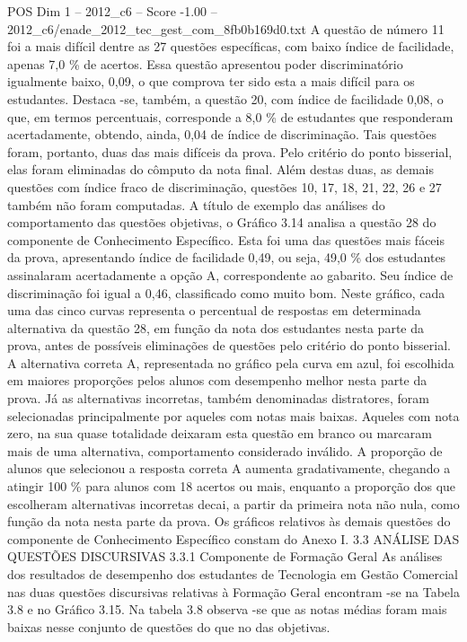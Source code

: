 \begin{textsample}{POS Dim 1 – 2012\_c6 – Score -1.00 – 2012\_c6/enade\_2012\_tec\_gest\_com\_8fb0b169d0.txt}
A questão de número 11 foi a mais difícil dentre as 27 questões específicas, com baixo índice de facilidade, apenas 7,0 \% de acertos.
Essa questão apresentou poder discriminatório igualmente baixo, 0,09, o que comprova ter sido esta a mais difícil para os estudantes.
Destaca -se, também, a questão 20, com índice de facilidade 0,08, o que, em termos percentuais, corresponde a 8,0 \% de estudantes que responderam acertadamente, obtendo, ainda, 0,04 de índice de discriminação.
Tais questões foram, portanto, duas das mais difíceis da prova.
Pelo critério do ponto bisserial, elas foram eliminadas do cômputo da nota final.
Além destas duas, as demais questões com índice fraco de discriminação, questões 10, 17, 18, 21, 22, 26 e 27 também não foram computadas.
A título de exemplo das análises do comportamento das questões objetivas, o Gráfico 3.14 analisa a questão 28 do componente de Conhecimento Específico.
Esta foi uma das questões mais fáceis da prova, apresentando índice de facilidade 0,49, ou seja, 49,0 \% dos estudantes assinalaram acertadamente a opção A, correspondente ao gabarito.
Seu índice de discriminação foi igual a 0,46, classificado como muito bom.
Neste gráfico, cada uma das cinco curvas representa o percentual de respostas em determinada alternativa da questão 28, em função da nota dos estudantes nesta parte da prova, antes de possíveis eliminações de questões pelo critério do ponto bisserial.
A alternativa correta A, representada no gráfico pela curva em azul, foi escolhida em maiores proporções pelos alunos com desempenho melhor nesta parte da prova.
Já as alternativas incorretas, também denominadas distratores, foram selecionadas principalmente por aqueles com notas mais baixas.
Aqueles com nota zero, na sua quase totalidade deixaram esta questão em branco ou marcaram mais de uma alternativa, comportamento considerado inválido.
A proporção de alunos que selecionou a resposta correta A aumenta gradativamente, chegando a atingir 100 \% para alunos com 18 acertos ou mais, enquanto a proporção dos que escolheram alternativas incorretas decai, a partir da primeira nota não nula, como função da nota nesta parte da prova.
Os gráficos relativos às demais questões do componente de Conhecimento Específico constam do Anexo I. 3.3 ANÁLISE DAS QUESTÕES DISCURSIVAS 3.3.1 Componente de Formação Geral As análises dos resultados de desempenho dos estudantes de Tecnologia em Gestão Comercial nas duas questões discursivas relativas à Formação Geral encontram -se na Tabela 3.8 e no Gráfico 3.15.
Na tabela 3.8 observa -se que as notas médias foram mais baixas nesse conjunto de questões do que no das objetivas.

\end{textsample}
